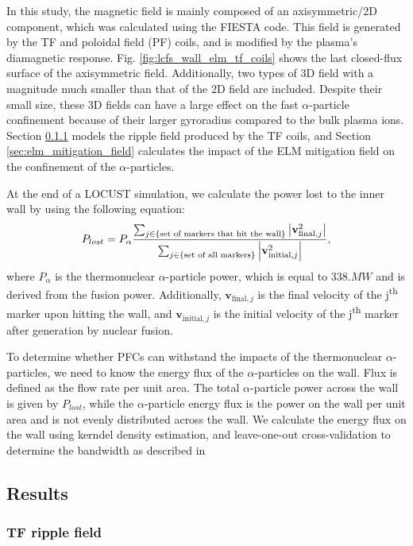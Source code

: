 \documentclass[10pt, a4paper, twoside]{article}
\begin{document}
In this study, the magnetic field is mainly composed of an axisymmetric/2D component, which was calculated using the FIESTA code. This field is generated by the TF and poloidal field (PF) coils, and is modified by the plasma's diamagnetic response. Fig. \ref{fig:lcfs_wall_elm_tf_coils} shows the last closed-flux surface of the axisymmetric field. Additionally, two types of 3D field with a magnitude much smaller than that of the 2D field are included. Despite their small size, these 3D fields can have a large effect on the fast $\alpha$-particle confinement because of their larger gyroradius compared to the bulk plasma ions. Section \ref{sec:tf_ripple_field} models the ripple field produced by the TF coils, and Section \ref{sec:elm_mitigation_field} calculates the impact of the ELM mitigation field on the confinement of the $\alpha$-particles.

At the end of a LOCUST simulation, we calculate the power lost to the inner wall by using the following equation: 
\begin{equation} 
P_{lost} = P_\alpha \frac{\sum_{j\in \text{\{set of markers that hit the wall\}}}\abs{\textbf{v}_{\text{final}, j}^2}}{\sum_{j \in \{\text{set of all markers}\}} \abs{\mathbf{v}_{\text{initial}, j}^2 }}, 
\end{equation}
where $P_\alpha$ is the thermonuclear $\alpha$-particle power, which is equal to $\si{338.MW}$ and is derived from the fusion power. Additionally, $\mathbf{v}_{\text{final}, j}$ is the final velocity of the j\textsuperscript{th} marker upon hitting the wall, and $\mathbf{v}_{\text{initial}, j}$ is the initial velocity of the j\textsuperscript{th} marker after generation by nuclear fusion.

To determine whether PFCs can withstand the impacts of the thermonuclear $\alpha$-particles, we need to know the energy flux of the $\alpha$-particles on the wall. Flux is defined as the flow rate per unit area. The total $\alpha$-particle power across the wall is given by $P_{lost}$, while the $\alpha$-particle energy flux is the power on the wall per unit area and is not evenly distributed across the wall. We calculate the energy flux on the wall using kerndel density estimation, and leave-one-out cross-validation to determine the bandwidth as described in  


\subsection{Results}

\subsubsection{TF ripple field}
\label{sec:tf_ripple_field}
\end{document}

